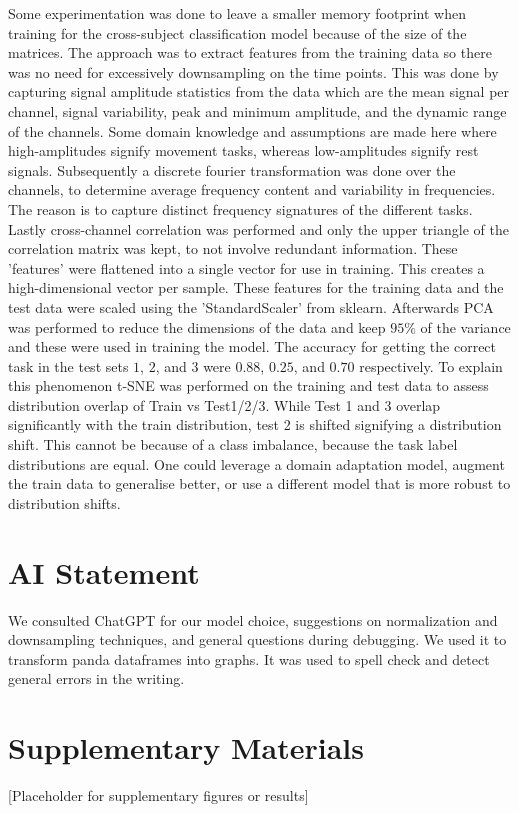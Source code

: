 \documentclass[conference]{IEEEtran}
\begin{document}
Some experimentation was done to leave a smaller memory footprint when training for the cross-subject classification model because of the size of the matrices. The approach was to extract features from the training data so there was no need for excessively downsampling on the time points. This was done by capturing signal amplitude statistics from the data which are the mean signal per channel, signal variability, peak and minimum amplitude, and the dynamic range of the channels. Some domain knowledge and assumptions are made here where high-amplitudes signify movement tasks, whereas low-amplitudes signify rest signals. Subsequently a discrete fourier transformation was done over the channels, to determine average frequency content and variability in frequencies. The reason is to capture distinct frequency signatures of the different tasks. Lastly cross-channel correlation was performed and only the upper triangle of the correlation matrix was kept, to not involve redundant information. These 'features' were flattened into a single vector for use in training. This creates a high-dimensional vector per sample. These features for the training data and the test data were scaled using the 'StandardScaler' from sklearn. Afterwards PCA was performed to reduce the dimensions of the data and keep $95\%$ of the variance and these were used in training the model. The accuracy for getting the correct task in the test sets $1$, $2$, and $3$ were $0.88$, $0.25$, and $0.70$ respectively. To explain this phenomenon t-SNE was performed on the training and test data to assess distribution overlap of Train vs Test1/2/3. While Test 1 and 3 overlap significantly with the train distribution, test 2 is shifted signifying a distribution shift. This cannot be because of a class imbalance, because the task label distributions are equal. One could leverage a domain adaptation model, augment the train data to generalise better, or use a different model that is more robust to distribution shifts.


\section*{AI Statement}
We consulted ChatGPT for our model choice, suggestions on normalization and downsampling techniques, and general questions during debugging.  We used it to transform panda dataframes
into graphs. It was used to spell check and detect general errors in the writing.



\section*{Supplementary Materials}
[Placeholder for supplementary figures or results]

\clearpage
\onecolumn
\end{document}

